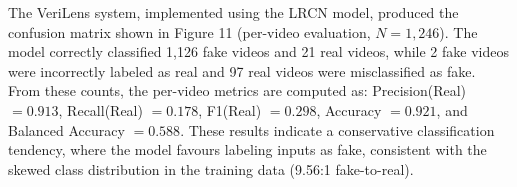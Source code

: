 



The VeriLens system, implemented using the LRCN model, produced the confusion matrix shown in Figure 11 (per-video evaluation, $N = 1{,}246$). The model correctly classified 1,126 fake videos and 21 real videos, while 2 fake videos were incorrectly labeled as real and 97 real videos were misclassified as fake. From these counts, the per-video metrics are computed as: Precision(Real) $= 0.913$, Recall(Real) $= 0.178$, F1(Real) $= 0.298$, Accuracy $= 0.921$, and Balanced Accuracy $= 0.588$. These results indicate a conservative classification tendency, where the model favours labeling inputs as fake, consistent with the skewed class distribution in the training data (9.56:1 fake-to-real).




